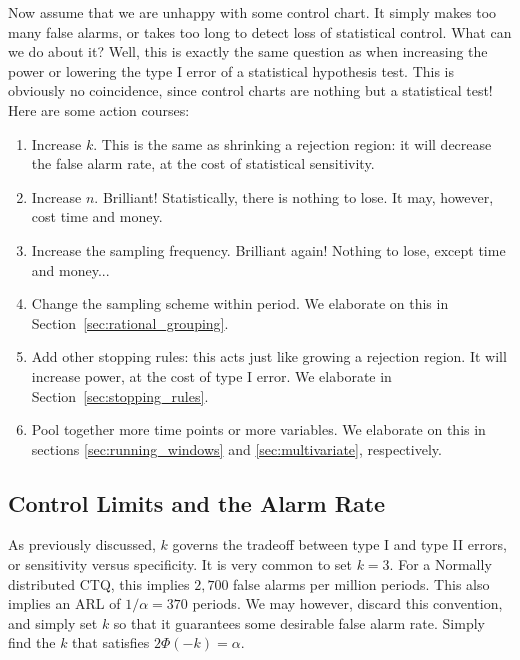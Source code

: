 Now assume that we are unhappy with some control chart. 
It simply makes too many false alarms, or takes too long to detect loss of statistical control.
What can we do about it?
Well, this is exactly the same question as when increasing the power or lowering the type I error of a statistical hypothesis test. This is obviously no coincidence, since control charts are nothing but a statistical test!
Here are some action courses:
\begin{enumerate}
\item Increase $k$. This is the same as shrinking a rejection region: 
it will decrease the false alarm rate, at the cost of statistical sensitivity.
\item Increase $n$. Brilliant! Statistically, there is nothing to lose. It may, however, cost time and money.
\item Increase the sampling frequency. Brilliant again! Nothing to lose, except time and money...
\item Change the sampling scheme within period. We elaborate on this in Section~\ref{sec:rational_grouping}.
\item Add other stopping rules: 
this acts just like growing a rejection region. It will increase power, at the cost of type I error. We elaborate in Section~\ref{sec:stopping_rules}.
\item Pool together more time points or more variables. We elaborate on this in sections \ref{sec:running_windows} and  \ref{sec:multivariate}, respectively. 
\end{enumerate}






\subsection{Control Limits and the Alarm Rate}
As previously discussed, $k$ governs the tradeoff between type I and type II errors, or sensitivity versus specificity.
It is very common to set $k=3$. 
For a Normally distributed CTQ, this implies $2,700$ false alarms per million periods. 
This also implies an ARL of $1/\alpha=370$ periods.
We may however, discard this convention, and simply set $k$ so that it guarantees some desirable false alarm rate. Simply find the $k$ that satisfies $2\Phi(-k)=\alpha$.




